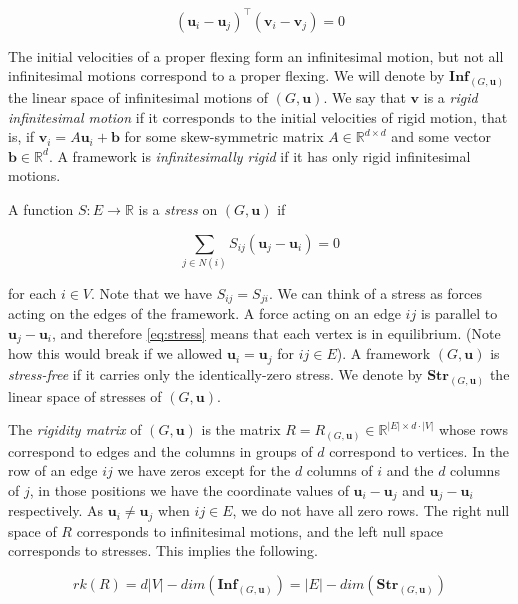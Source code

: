 \documentclass{article}
\newcommand{\vu}[0]{\mathbf{u}}
\newcommand{\vv}[0]{\mathbf{v}}
\newcommand{\R}[0]{\mathbb{R}}
\begin{document}
\begin{equation}\label{eq:infinitesimal}
    (\vu_i-\vu_j)^\top (\vv_i -\vv_j)=0
\end{equation}

The initial velocities of a proper flexing form an infinitesimal motion, but not all infinitesimal motions correspond to a proper flexing. We will denote by $\mathbf{Inf}_{(G,\vu)}$ the linear space of infinitesimal motions of $(G,\vu)$. We say that $\vv$ is a \emph{rigid infinitesimal motion} if it corresponds to the initial velocities of rigid motion, that is, if $\vv_i=A\vu_i+\mathbf{b}$
for some skew-symmetric matrix $A\in\R^{d\times d}$ and some vector $\mathbf{b}\in\R^d$. A framework is \emph{infinitesimally rigid} if it has only rigid infinitesimal motions. 

A function $S:E\rightarrow \mathbb{R}$ is a \emph{stress} on $(G,\vu)$ if 

\begin{equation}\label{eq:stress}
\sum\limits_{j\in N(i)} S_{ij}(\vu_j-\vu_i)=0  
\end{equation}

for each $i\in V$. Note that we have $S_{ij} = S_{ji}$. We can think of a stress as forces acting on the edges of the framework. A force acting on an edge $ij$ is parallel to $\vu_j-\vu_i$, and therefore \eqref{eq:stress} means that each vertex is in equilibrium. (Note how this would break if we allowed $\vu_i=\vu_j$ for $ij\in E$). A framework $(G,\vu)$ is \emph{stress-free} if it carries only the identically-zero stress. We denote by $\mathbf{Str}_{(G,\vu)}$ the linear space of stresses of $(G,\vu)$.

The \emph{rigidity matrix} of $(G,\vu)$ is the matrix $R=R_{(G,\vu)}\in \R^{|E|\times d\cdot|V|}$ whose rows correspond to edges and the columns in groups of $d$ correspond to vertices. In the row of an edge $ij$ we have zeros except for the $d$ columns of $i$ and the $d$ columns of $j$, in those positions we have the coordinate values of $\vu_i-\vu_j$ and $\vu_j-\vu_i$ respectively. As $\vu_i\neq \vu_j$ when $ij\in E$, we do not have all zero rows. The right null space of $R$ corresponds to infinitesimal motions, and the left null space corresponds to stresses. This implies the following. 

\begin{equation}\label{eq:dimension}
 rk(R) = d|V|-dim(\mathbf{Inf}_{(G,\vu)}) = |E|-dim(\mathbf{Str}_{(G,\vu)})
\end{equation}
 
\end{document}
